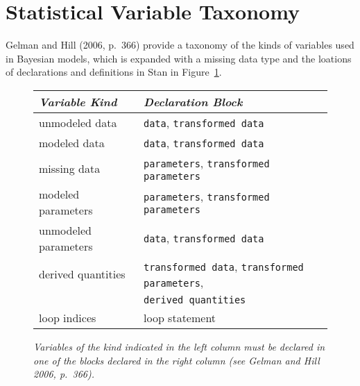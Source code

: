 \documentclass[10pt]{report}
\newcommand{\Stan}{Stan\xspace}
\newcommand{\code}[1]{{\tt #1}}
\newcommand{\reffigure}[1]{Figure~\ref{#1.figure}}
\begin{document}
\section{Statistical Variable Taxonomy}

Gelman and Hill (2006, p.~366) provide a taxonomy of the kinds of
variables used in Bayesian models, which is expanded with a missing
data type and the loations of declarations and definitions in \Stan in
\reffigure{variable-kinds}.
%
\begin{figure}
\begin{center}
\begin{tabular}{l|l}
{\it Variable Kind} & {\it Declaration Block}
\\ \hline\hline
unmodeled data & \code{data}, \code{transformed data}
\\ 
modeled data & \code{data}, \code{transformed data}
\\ \hline
missing data & \code{parameters}, \code{transformed parameters}
\\
modeled parameters & \code{parameters}, \code{transformed parameters}
\\
unmodeled parameters & \code{data}, \code{transformed data}
\\[2pt] \hline
derived quantities & \code{transformed data}, \code{transformed parameters}, 
\\ 
& \code{derived quantities}
\\ \hline\hline
loop indices & loop statement
\\ 
\end{tabular}
\end{center}
\caption{\it Variables of the kind indicated in the left column must
  be declared in one of the blocks declared in the right
  column (see Gelman and Hill 2006,
  p.~366).}\label{variable-kinds.figure}
\end{figure}
%

\end{document}
